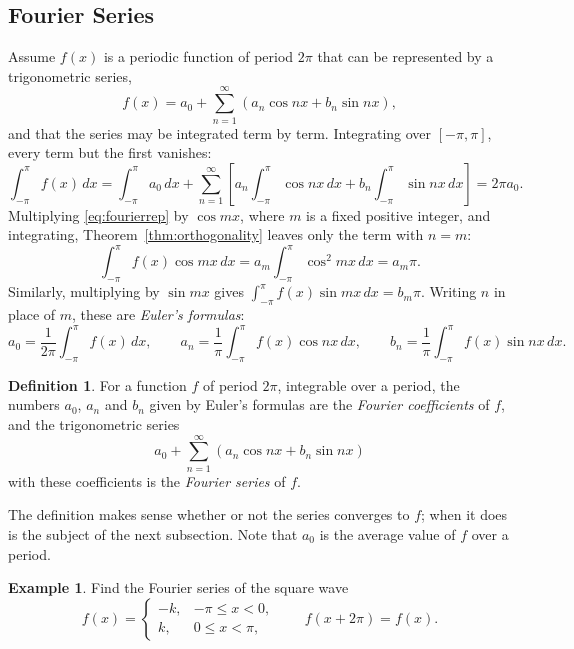 \documentclass[11pt,a4paper]{article}
\theoremstyle{definition}
\newtheorem{defn}[thm]{Definition}
\newtheorem{exa}[thm]{Example}
\begin{document}
{\color[wave]{485}\subsection{Fourier Series}}

Assume $f(x)$ is a periodic function of period $2\pi$ that can be represented by
a trigonometric series,
\begin{equation}
f(x) = a_0 + \sum^{\infty}_{n = 1} (a_n \cos nx + b_n \sin n x) ,
\label{eq:fourierrep}
\end{equation}
and that the series may be integrated term by term. Integrating over
$[-\pi,\pi]$, every term but the first vanishes:
\[\int^{\pi}_{-\pi} f(x)\,dx = \int^{\pi}_{-\pi}a_0\, dx + \sum^{\infty}_{n =
1}\left[a_n\int^{\pi}_{-\pi}\cos nx\, dx + b_n \int^{\pi}_{-\pi} \sin nx\,
dx\right] = 2\pi a_0 .\]
Multiplying \eqref{eq:fourierrep} by $\cos mx$, where $m$ is a fixed positive
integer, and integrating, Theorem~\ref{thm:orthogonality} leaves only the term
with $n = m$:
\[\int^{\pi}_{-\pi} f(x) \cos mx\, dx = a_m\int^{\pi}_{-\pi} \cos^2 mx\, dx =
a_m \pi .\]
Similarly, multiplying by $\sin mx$ gives $\int^{\pi}_{-\pi} f(x)\sin mx\,dx =
b_m\pi$. Writing $n$ in place of $m$, these are \emph{Euler's formulas}:
\[a_0 = \frac{1}{2\pi}\int^{\pi}_{-\pi}f(x)\,dx ,\qquad a_n =
\frac{1}{\pi}\int^{\pi}_{-\pi} f(x) \cos nx\, dx ,\qquad b_n =
\frac{1}{\pi}\int^{\pi}_{-\pi} f(x)\sin nx\, dx .\]

\begin{defn}
\label{defn:fourierseries}
For a function $f$ of period $2\pi$, integrable over a period, the numbers
$a_0$, $a_n$ and $b_n$ given by Euler's formulas are the \emph{Fourier
coefficients} of $f$, and the trigonometric series
\[a_0 + \sum^{\infty}_{n=1} (a_n \cos nx + b_n \sin nx)\]
with these coefficients is the \emph{Fourier series} of $f$.
\end{defn}

The definition makes sense whether or not the series converges to $f$; when it
does is the subject of the next subsection. Note that $a_0$ is the average value
of $f$ over a period.

\begin{exa}
\label{ex:squarewave}
Find the Fourier series of the square wave
\[f(x) =
\begin{cases}
-k, & -\pi \leq x <0,\\
k, & 0\leq x <\pi,
\end{cases}\qquad f(x + 2\pi) = f(x) .\]
\end{exa}
\end{document}
